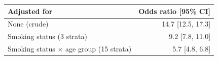 \begin{tabular}{lr}
\toprule
Adjusted for & Odds ratio [95\% CI] \\
\midrule
None (crude) & 14.7 [12.5, 17.3] \\
Smoking status (3 strata) & 9.2 [7.8, 11.0] \\
Smoking status $\times$ age group (15 strata) & 5.7 [4.8, 6.8] \\
\bottomrule
\end{tabular}
